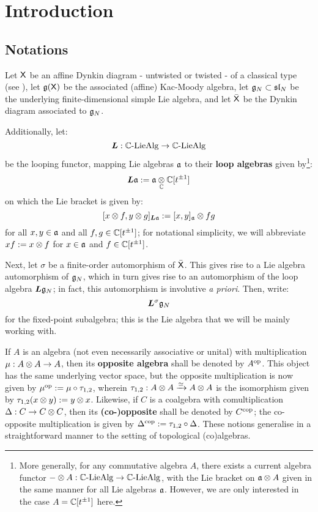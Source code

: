 \section{Introduction}
    \subsection{Notations}
        Let $\mathsf{X}$ be an affine Dynkin diagram - untwisted or twisted - of a classical type (see \cite[Chapter 4, Tables Aff 2 and 3, p. 55]{kac_infinite_dimensional_lie_algebras}), let $\mathfrak{g}(\mathsf{X})$ be the associated (affine) Kac-Moody algebra, let $\mathfrak{g}_N \subset \mathfrak{sl}_N$ be the underlying finite-dimensional simple Lie algebra, and let $\bar{\mathsf{X}}$ be the Dynkin diagram associated to $\mathfrak{g}_N$.
        
        Additionally, let:
            $$\boldsymbol{L}: \mathbb{C}\text{-}\mathrm{Lie}\mathrm{Alg} \to \mathbb{C}\text{-}\mathrm{Lie}\mathrm{Alg}$$
        be the looping functor, mapping Lie algebras $\mathfrak{a}$ to their \textbf{loop algebras} given by\footnote{More generally, for any commutative algebra $A$, there exists a current algebra functor $- \tensor A: \bbC\-\Lie\Alg \to \bbC\-\Lie\Alg$, with the Lie bracket on $\a \tensor A$ given in the same manner for all Lie algebras $\mathfrak{a}$. However, we are only interested in the case $A = \mathbb{C}[t^{\pm 1}]$ here.}:
            $$\Loop \a := \a \tensor_{\bbC} \bbC[t^{\pm 1}]$$
        on which the Lie bracket is given by:
            $$[x \tensor f, y \tensor g]_{\Loop \a} := [x, y]_{\a} \tensor fg$$
        for all $x, y \in \mathfrak{a}$ and all $f, g \in \mathbb{C}[t^{\pm 1}]$; for notational simplicity, we will abbreviate $xf := x \tensor f$ for $x \in \mathfrak{a}$ and $f \in \mathbb{C}[t^{\pm 1}]$.
        
        Next, let $\sigma$ be a finite-order automorphism of $\bar{\mathsf{X}}$. This gives rise to a Lie algebra automorphism of $\mathfrak{g}_N$, which in turn gives rise to an automorphism of the loop algebra $\boldsymbol{L}\mathfrak{g}_N$; in fact, this automorphism is involutive \textit{a priori}. Then, write:
            $$\boldsymbol{L}^{\sigma}\mathfrak{g}_N$$
        for the fixed-point subalgebra; this is the Lie algebra that we will be mainly working with.

        If $A$ is an algebra (not even necessarily associative or unital) with multiplication $\mu: A \tensor A \to A$, then its \textbf{opposite algebra} shall be denoted by $A^{\mathrm{op}}$. This object has the same underlying vector space, but the opposite multiplication is now given by $\mu^{\mathrm{op}} := \mu \circ \tau_{1, 2}$, wherein $\tau_{1, 2}: A \tensor A \xrightarrow[]{\cong} A \tensor A$ is the isomorphism given by $\tau_{1, 2}(x \tensor y) := y \tensor x$. Likewise, if $C$ is a coalgebra with comultiplication $\Delta: C \to C \tensor C$, then its \textbf{(co-)opposite} shall be denoted by $C^{\mathrm{cop}}$; the co-opposite multiplication is given by $\Delta^{\mathrm{cop}} := \tau_{1, 2} \circ \Delta$. These notions generalise in a straightforward manner to the setting of topological (co)algebras.

